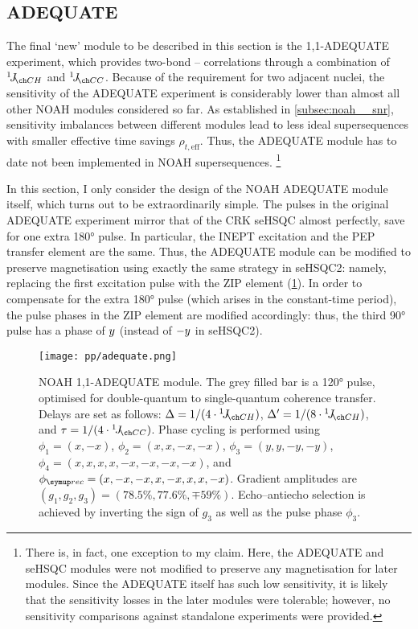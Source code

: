 \subsection{ADEQUATE}
\label{subsec:noah__adequate}

The final `new' module to be described in this section is the 1,1-ADEQUATE experiment\autocite{Reif1996JMRSA}, which provides two-bond -- correlations through a combination of $\oneJ{CH}$ and $\oneJ{CC}$.
Because of the requirement for two adjacent \carbon{} nuclei, the sensitivity of the ADEQUATE experiment is considerably lower than almost all other NOAH modules considered so far.
As established in \cref{subsec:noah__snr}, sensitivity imbalances between different modules lead to less ideal supersequences with smaller effective time savings $\rho_{t,\text{eff}}$.
Thus, the ADEQUATE module has to date not been implemented in NOAH supersequences.%
\footnote{There is, in fact, one exception to my claim\autocite{RaoKakita2020RSCA}. Here, the ADEQUATE and seHSQC modules were not modified to preserve any magnetisation for later modules. Since the ADEQUATE itself has such low sensitivity, it is likely that the sensitivity losses in the later modules were tolerable; however, no sensitivity comparisons against standalone experiments were provided.}

In this section, I only consider the design of the NOAH ADEQUATE module itself, which turns out to be extraordinarily simple.
The \proton{} pulses in the original ADEQUATE experiment mirror that of the CRK seHSQC almost perfectly, save for one extra \ang{180} pulse.
In particular, the INEPT excitation and the PEP transfer element are the same.
Thus, the ADEQUATE module can be modified to preserve  magnetisation using exactly the same strategy in seHSQC2: namely, replacing the first \proton{} excitation pulse with the ZIP element (\cref{fig:adequate_noah}).
In order to compensate for the extra \ang{180} pulse (which arises in the constant-time period), the pulse phases in the ZIP element are modified accordingly: thus, the third \proton{} \ang{90} pulse has a phase of $y\/$ (instead of $-y\/$ in seHSQC2).

\begin{figure}[htb]
    \centering
    \texttt{[image: pp/adequate.png]}%
    \caption[NOAH 1,1-ADEQUATE module]{
        NOAH 1,1-ADEQUATE module.
        The grey filled bar is a \ang{120} pulse, optimised for \carbon{} double-quantum to single-quantum coherence transfer\autocite{Mareci1982JMR}.
        Delays are set as follows: $\Delta = 1 / (4 \cdot \oneJ{CH})$, $\Delta' = 1 / (8 \cdot \oneJ{CH})$, and $\tau = 1 / (4 \cdot \oneJ{CC})$.
        Phase cycling is performed using $\phi_1 = (x, -x)$, $\phi_2 = (x, x, -x, -x)$, $\phi_3 = (y, y, -y, -y)$, $\phi_4 = (x, x, x, x, -x, -x, -x, -x)$, and $\phirec = (x, -x, -x, x, -x, x, x, -x)$.
        Gradient amplitudes are $(g_1, g_2, g_3) = (78.5\%, 77.6\%, \mp 59\%)$.
        Echo--antiecho selection is achieved by inverting the sign of $g_3$ as well as the pulse phase $\phi_3$.
    }
    \label{fig:adequate_noah}
\end{figure}

